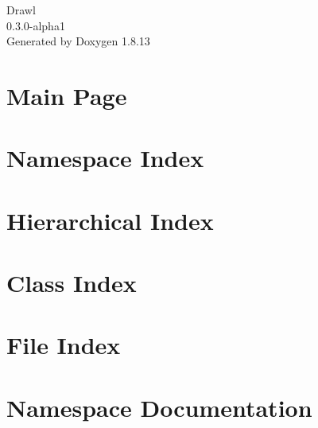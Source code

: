 \documentclass[twoside]{book}
\newcommand{\+}{\discretionary{\mbox{\scriptsize$\hookleftarrow$}}{}{}}
\newcommand{\clearemptydoublepage}{%
  \newpage{\pagestyle{empty}\cleardoublepage}%
}
\begin{document}
\hypersetup{pageanchor=false,
             bookmarksnumbered=true,
             pdfencoding=unicode
            }
\begin{titlepage}
\vspace*{7cm}
\begin{center}%
{\Large Drawl \\[1ex]\large 0.\+3.\+0-\/alpha1 }\\
\vspace*{1cm}
{\large Generated by Doxygen 1.8.13}\\
\end{center}
\end{titlepage}
\clearemptydoublepage
{}
\tableofcontents
\clearemptydoublepage
{}
\hypersetup{pageanchor=true}

\chapter{Main Page}
\label{index}\hypertarget{index}{}
\chapter{Namespace Index}

\chapter{Hierarchical Index}

\chapter{Class Index}

\chapter{File Index}

\chapter{Namespace Documentation}




\end{document}

